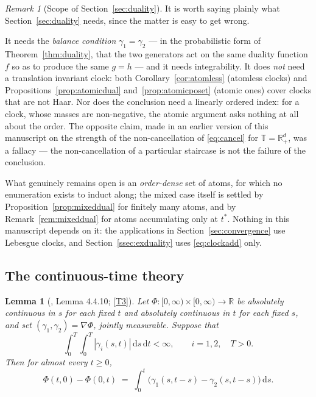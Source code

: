 \documentclass[11pt,a4paper]{article}
\theoremstyle{plain}
\newtheorem{lemma}[theorem]{Lemma}
\theoremstyle{definition}
\theoremstyle{remark}
\newtheorem{remark}[theorem]{Remark}
\newcommand{\R}{\mathbb{R}}
\newcommand{\Rp}{\R_+}
\newcommand{\T}{\mathbb{T}}                     %
\newcommand{\dif}{\,\mathrm{d}}
\newcommand{\EK}{\cite{EK86}}
\begin{document}
\begin{remark}[Scope of Section~\ref{sec:duality}]
  \label{rem:dualscope}
  It is worth saying plainly what Section~\ref{sec:duality} needs, since the
  matter is easy to get wrong.

  It needs the \emph{balance condition} $\gamma_1 = \gamma_2$ --- in the
  probabilistic form of Theorem~\ref{thm:duality}, that the two generators act on
  the same duality function $f$ so as to produce the same $g = h$ --- and it needs
  integrability.  It does \emph{not} need a translation invariant clock: both
  Corollary~\ref{cor:atomless} (atomless clocks) and
  Propositions~\ref{prop:atomicdual} and~\ref{prop:atomicposet} (atomic ones)
  cover clocks that are not Haar.
  Nor does the conclusion need a linearly ordered index: for a clock, whose
  masses are non-negative, the atomic argument asks nothing at all about the
  order.  The
  opposite claim, made in an earlier version of this manuscript on the strength
  of the non-cancellation of \eqref{eq:cancel} for $\T = \Rp^d$, was a fallacy ---
  the non-cancellation of a particular staircase is not the failure of the
  conclusion.

  What genuinely remains open is an \emph{order-dense} set of atoms, for which
  no enumeration exists to induct along; the mixed case itself is settled by
  Proposition~\ref{prop:mixeddual} for finitely many atoms, and by
  Remark~\ref{rem:mixeddual} for atoms accumulating only at $t^*$.  Nothing
  in this manuscript depends on it: the
  applications in Section~\ref{sec:convergence} use Lebesgue clocks, and
  Section~\ref{ssec:exduality} uses \eqref{eq:clockadd} only.
\end{remark}

\subsection{The continuous-time theory}
\label{ssec:dualcont}

\begin{lemma}[\EK, Lemma 4.4.10; \eqref{T3}]
  \label{lem:calculus}
  Let $\Phi : [0,\infty) \times [0,\infty) \to \R$ be absolutely continuous in $s$
  for each fixed $t$ and absolutely continuous in $t$ for each fixed $s$, and
  set $(\gamma_1,\gamma_2) = \nabla\Phi$, jointly measurable.  Suppose that
  \begin{equation}
    \label{eq:calcint}
    \int_0^T \! \int_0^T |\gamma_i(s,t)| \dif s \dif t < \infty,
    \qquad i = 1,2, \quad T > 0 .
  \end{equation}
  Then for almost every $t \geq 0$,
  \begin{equation}
    \label{eq:calcconc}
    \Phi(t,0) - \Phi(0,t) \;=\; \int_0^t \bigl( \gamma_1(s,t-s) - \gamma_2(s,t-s) \bigr) \dif s .
  \end{equation}
\end{lemma}
\end{document}
